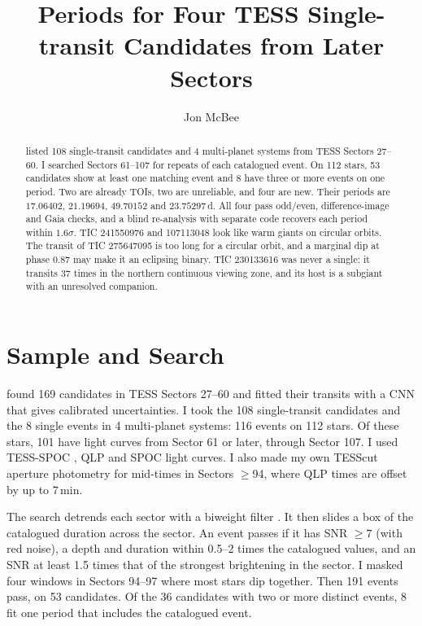\documentclass{aastex701}
\begin{document}
\title{Periods for Four TESS Single-transit Candidates from Later Sectors}

\author[orcid=0009-0000-7524-4470]{Jon McBee}

\begin{abstract}
\citet{Salinas2026} listed 108 single-transit candidates and 4 multi-planet systems from TESS
Sectors 27--60. I searched Sectors 61--107 for repeats of each catalogued event. On 112 stars, 53
candidates show at least one matching event and 8 have three or more events on one period. Two
are already TOIs, two are unreliable, and four are new. Their periods are
$17.06402$, $21.19694$, $49.70152$ and $23.75297$\,d. All four pass odd/even, difference-image and
Gaia checks, and a blind re-analysis with separate code recovers each period
within $1.6\sigma$. TIC 241550976 and 107113048 look like warm giants on circular orbits. The
transit of TIC 275647095 is too long for a circular orbit, and a marginal dip at phase 0.87 may make it
an eclipsing binary. TIC 230133616
was never a single: it transits 37 times in the northern continuous viewing zone, and its host is a
subgiant with an unresolved companion.
\end{abstract}


\section{Sample and Search}

\citet{Salinas2026} found 169 candidates in TESS Sectors 27--60 and fitted their transits with a
CNN that gives calibrated uncertainties. I took the 108 single-transit candidates and the 8
single events in 4 multi-planet systems: 116 events on 112 stars. Of these stars, 101 have
light curves from Sector 61 or later, through Sector 107. I used TESS-SPOC \citep{Caldwell2020},
QLP \citep{Huang2020} and SPOC light curves. I also made my own TESScut aperture photometry
\citep{Brasseur2019} for mid-times in Sectors $\geq$94, where QLP times are offset by up to
7\,min.

The search detrends each sector with a biweight filter \citep{Hippke2019}. It then slides a box of
the catalogued duration across the sector. An event passes if it has SNR $\geq7$ (with red noise),
a depth and duration within 0.5--2 times the catalogued values, and an SNR at least 1.5 times
that of the strongest brightening in the sector. I masked four windows in Sectors 94--97 where
most stars dip together. Then 191 events pass, on 53 candidates. Of the 36 candidates with two
or more distinct events, 8 fit one period that includes the catalogued event.
\end{document}
